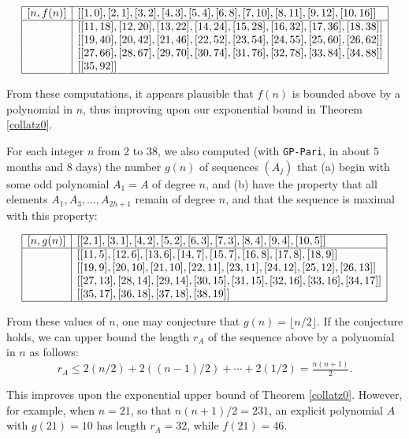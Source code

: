 \documentclass [12pt]{article}
\begin{document}
$$\begin{array}{|l|l|}
\hline
[n,f(n)]&[[1,0],[2,1],[3,2],[4,3],[5,4],[6,8],[7,10],[8,11],[9,12],[10,16]]\\
\hline
&[[11,18],[12,20],[13,22],[14,24],[15,28],[16,32],[17,36],[18,38]]\\
&[[19,40],[20,42],[21,46],[22,52],[23,54],[24,55],[25,60],[26,62]]\\
&[[27,66],[28,67],[29,70],[30,74],[31,76],[32,78],[33,84],[34,88]]\\
&[[35,92]]\\
\hline
\end{array}$$

From these computations, it appears plausible that $f(n)$ is bounded above by a polynomial in $n$, thus improving upon our exponential bound in Theorem \ref{collatz0}.

For each integer $n$ from $2$ to $38$, we also computed (with {\tt GP-Pari}, in about $5$ months and $8$ days) the number $g(n)$ of sequences $(A_j)$ that  
(a) begin with some odd polynomial $A_1=A$ of degree $n$, and  
(b) have the property that all elements $A_1,A_3,\ldots ,A_{2h+1}$ remain of degree $n$, and that the sequence is maximal with this property:

$$\begin{array}{|l|l|}
\hline
[n,g(n)]&[[2,1],[3,1],[4,2],[5,2],[6,3],[7,3],[8,4],[9,4],[10,5]]\\
\hline
&[[11,5],[12,6],[13,6],[14,7],[15,7],[16,8],[17,8],[18,9]]\\
&[[19,9],[20,10],[21,10],[22,11],[23,11],[24,12],[25,12],[26,13]]\\
&[[27,13],[28,14],[29,14],[30,15],[31,15],[32,16],[33,16],[34,17]]\\
&[[35,17],[36,18],[37,18],[38,19]]\\
\hline
\end{array}$$

From these values of $n$, one may conjecture that $g(n)= \lfloor n/2 \rfloor$.  
If the conjecture holds, we can upper bound the length $r_A$ of the sequence above by a polynomial in $n$ as follows:
\begin{equation}
\label{polyBound}
r_A \leq 2(n/2)+2((n-1)/2)+\cdots+2(1/2) = \tfrac{n(n+1)}{2}.
\end{equation} 

This improves upon the exponential upper bound of Theorem \ref{collatz0}. However, for example, when $n=21$, so that $n(n+1)/2=231$, an explicit polynomial $A$ with $g(21)=10$ has length $r_A=32$, while $f(21)=46$.
\end{document}
